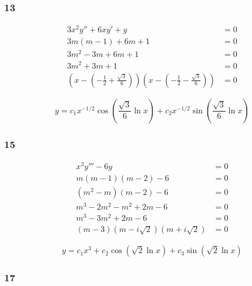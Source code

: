 \documentclass{article}
\begin{document}
\subsubsection{13}

\begin{align*}
  3 x^2 y'' + 6 x y' + y                                                                                                                  & = 0 \\
  3 m (m - 1) + 6m + 1                                                                                                                    & = 0 \\
  3m^2 - 3m + 6m + 1                                                                                                                      & = 0 \\
  3m^2 + 3m + 1                                                                                                                           & = 0 \\
  \left( x - \left( -\frac{1}{2} + \frac{\sqrt{3}}{6} \right) \right) \left( x - \left( -\frac{1}{2} - \frac{\sqrt{3}}{6} \right) \right) & = 0
\end{align*}

\[y = c_1 x^{-1 / 2} \cos \left( \frac{\sqrt{3}}{6} \ln x \right) + c_2 x^{-1 / 2} \sin \left( \frac{\sqrt{3}}{6} \ln x \right)\]

\subsubsection{15}

\begin{align*}
  x^3 y''' - 6y                             & = 0 \\
  m (m - 1) (m - 2) - 6                     & = 0 \\
  (m^2 - m) (m - 2) - 6                     & = 0 \\
  m^3 - 2m^2 - m^2 + 2m - 6                 & = 0 \\
  m^3 - 3m^2 + 2m - 6                       & = 0 \\
  (m - 3) (m - i \sqrt{2}) (m + i \sqrt{2}) & = 0
\end{align*}

\[y = c_1 x^3 + c_2 \cos (\sqrt{2} \ln x) + c_3 \sin (\sqrt{2} \ln x)\]

\subsubsection{17}
\end{document}
